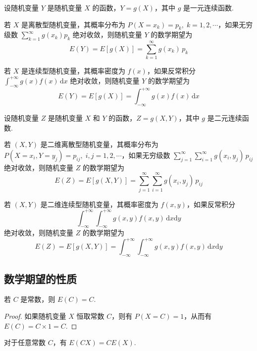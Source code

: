 \begin{theorem}
    \indent 设随机变量 $Y$ 是随机变量 $X$ 的函数，$Y=g(X)$，其中 $g$ 是一元连续函数.

    若 $X$ 是离散型随机变量，其概率分布为 $P(X=x_k) = p_k, \; k=1,2,\cdots$，如果无穷级数 $\displaystyle\sum_{k=1}^{\infty} g(x_k) p_k$ 绝对收敛，则随机变量 $Y$ 的数学期望为
    $$
    E(Y) = E[g(X)] = \sum_{k=1}^{\infty} g(x_k) \, p_k
    $$

    若 $X$ 是连续型随机变量，其概率密度为 $f(x)$，如果反常积分 $\displaystyle\int_{-\infty}^{+\infty} g(x) f(x) \, \text{d}x$ 绝对收敛，则随机变量 $Y$ 的数学期望为
    $$
    E(Y) = E[g(X)] = \int_{-\infty}^{+\infty} g(x) f(x) \, \text{d}x
    $$
\end{theorem}

\begin{theorem}
    \indent 设随机变量 $Z$ 是随机变量 $X$ 和 $Y$ 的函数，$Z=g(X,Y)$，其中 $g$ 是二元连续函数.

    若 $(X,Y)$ 是二维离散型随机变量，其概率分布为 $P(X=x_i,Y=y_j) = p_{ij}, \; i,j=1,2,\cdots$，如果无穷级数 $\displaystyle\sum_{j=1}^{\infty} \displaystyle\sum_{i=1}^{\infty} g(x_i,y_j) \, p_{ij}$ 绝对收敛，则随机变量 $Z$ 的数学期望为
    $$
    E(Z) = E[g(X,Y)] = \sum_{j=1}^{\infty} \sum_{i=1}^{\infty} g(x_i,y_j) \, p_{ij}
    $$

    若 $(X,Y)$ 是二维连续型随机变量，其概率密度为 $f(x,y)$，如果反常积分
    $$
    \displaystyle\int_{-\infty}^{+\infty} \displaystyle\int_{-\infty}^{+\infty} g(x,y) f(x,y) \, \text{d}x \text{d}y
    $$
    绝对收敛，则随机变量 $Z$ 的数学期望为
    $$
    E(Z) = E[g(X,Y)] = \int_{-\infty}^{+\infty} \int_{-\infty}^{+\infty} g(x,y) f(x,y) \, \text{d}x \text{d}y
    $$
\end{theorem}

\subsection{数学期望的性质}

\begin{property}[][][property:E(C)=C]
    \indent 若 $C$ 是常数，则 $E(C)=C$.
\end{property}

\begin{proof}
    如果随机变量 $X$ 恒取常数 $C$，则有 $P(X=C)=1$，从而有 $E(C) = C \times 1 = C$.
\end{proof}

\begin{property}[][][property:E(CX)=CE(X)]
    \indent 对于任意常数 $C$，有 $E(CX)=CE(X)$.
\end{property}

